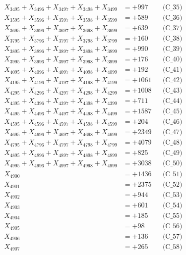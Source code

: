 \documentclass[a4paper,10pt]{article}
\begin{document}
{\begin{align}
X_{3495} + X_{3496} + X_{3497} + X_{3498} + X_{3499} &= +997 && \text{(C\_35)} \\
\allowbreak
X_{3595} + X_{3596} + X_{3597} + X_{3598} + X_{3599} &= +589 && \text{(C\_36)} \\
X_{3695} + X_{3696} + X_{3697} + X_{3698} + X_{3699} &= +639 && \text{(C\_37)} \\
X_{3795} + X_{3796} + X_{3797} + X_{3798} + X_{3799} &= +160 && \text{(C\_38)} \\
X_{3895} + X_{3896} + X_{3897} + X_{3898} + X_{3899} &= +990 && \text{(C\_39)} \\
X_{3995} + X_{3996} + X_{3997} + X_{3998} + X_{3999} &= +176 && \text{(C\_40)} \\
\allowbreak
X_{4095} + X_{4096} + X_{4097} + X_{4098} + X_{4099} &= +192 && \text{(C\_41)} \\
X_{4195} + X_{4196} + X_{4197} + X_{4198} + X_{4199} &= +1061 && \text{(C\_42)} \\
X_{4295} + X_{4296} + X_{4297} + X_{4298} + X_{4299} &= +1008 && \text{(C\_43)} \\
X_{4395} + X_{4396} + X_{4397} + X_{4398} + X_{4399} &= +711 && \text{(C\_44)} \\
X_{4495} + X_{4496} + X_{4497} + X_{4498} + X_{4499} &= +1587 && \text{(C\_45)} \\
\allowbreak
X_{4595} + X_{4596} + X_{4597} + X_{4598} + X_{4599} &= +204 && \text{(C\_46)} \\
X_{4695} + X_{4696} + X_{4697} + X_{4698} + X_{4699} &= +2349 && \text{(C\_47)} \\
X_{4795} + X_{4796} + X_{4797} + X_{4798} + X_{4799} &= +4079 && \text{(C\_48)} \\
X_{4895} + X_{4896} + X_{4897} + X_{4898} + X_{4899} &= +825 && \text{(C\_49)} \\
X_{4995} + X_{4996} + X_{4997} + X_{4998} + X_{4999} &= +3038 && \text{(C\_50)} \\
\allowbreak
X_{4900} &= +1436 && \text{(C\_51)} \\
X_{4901} &= +2375 && \text{(C\_52)} \\
X_{4902} &= +944 && \text{(C\_53)} \\
X_{4903} &= +601 && \text{(C\_54)} \\
X_{4904} &= +185 && \text{(C\_55)} \\
\allowbreak
X_{4905} &= +98 && \text{(C\_56)} \\
X_{4906} &= +136 && \text{(C\_57)} \\
X_{4907} &= +265 && \text{(C\_58)} \\

\end{align}}
\end{document}
